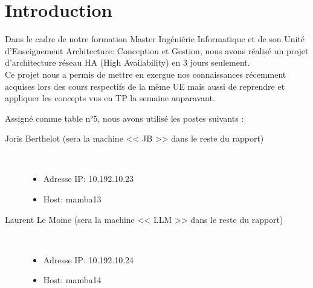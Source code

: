 \documentclass[11pt,a4paper]{report}
\begin{document}
    
    \newpage
    \setcounter{secnumdepth}{3}
    \setcounter{tocdepth}{4}
    \tableofcontents
    \newpage
    
        \section*{Introduction}
        
        
        Dans le cadre de notre formation Master Ingéniérie Informatique et de son Unité d'Enseignement Architecture: Conception et Gestion, nous avons réalisé un projet d'architecture réseau HA (High Availability) en 3 jours seulement.\\
        
        Ce projet nous a permis de mettre en exergue nos connaissances récemment acquises lors des cours respectifs de la même UE mais aussi de reprendre et appliquer les concepts vus en TP la semaine auparavant.
        
        
            Assigné comme table n°5, nous avons utilisé les postes suivants :\\
        
            \begin{description}
                \item[Joris Berthelot (sera la machine << JB >> dans le reste du rapport)] \hfill \\
                    \begin{itemize}
                        \item Adresse IP: 10.192.10.23
                        \item Host: mamba13
                    \end{itemize}
                \item[Laurent Le Moine (sera la machine << LLM >> dans le reste du rapport)] \hfill \\
                    \begin{itemize}
                        \item Adresse IP: 10.192.10.24
                        \item Host: mamba14
                    \end{itemize}
            \end{description}
        
        
        
\end{document}
